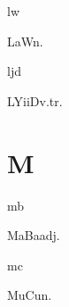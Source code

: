\begin{multicols*}{2}
\begin{dictroot}{l}{w}
    \begin{dictentry}{LaW}{n.}
    \end{dictentry}
\end{dictroot}

\begin{dictroot}{lj}{d}
    \begin{dictentry}{LYiiD}{v.tr.}
    \end{dictentry}
\end{dictroot}

\section*{M}

\begin{dictroot}{m}{b}
    \begin{dictentry}{MaBa}{adj.}
    \end{dictentry}
\end{dictroot}

\begin{dictroot}{m}{c}
    \begin{dictentry}{MuCu}{n.}
    \end{dictentry}
\end{dictroot}


\end{multicols*}
